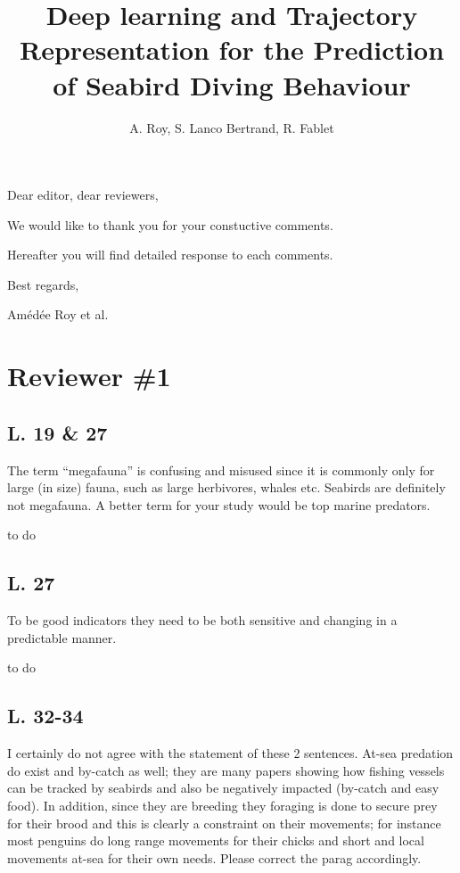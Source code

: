 \documentclass{ar2rc}
\title{Deep learning and Trajectory Representation for the Prediction of Seabird Diving Behaviour}
\author{A. Roy, S. Lanco Bertrand, R. Fablet}
\begin{document}
\maketitle

\section*{}

Dear editor, dear reviewers,

We would like to thank you for your constuctive comments.

Hereafter you will find detailed response to each comments.

Best regards,

Amédée Roy et al.

\section*{Reviewer \#1}

\subsection*{L. 19 \& 27}

\RC The term “megafauna” is confusing and misused since it is commonly only for large (in size) fauna, such as large herbivores, whales etc. Seabirds are definitely not megafauna. A better term for your study would be top marine predators.

\AR to do

\subsection*{L. 27}

\RC To be good indicators they need to be both sensitive and changing in a predictable manner.

\AR to do

\subsection*{L. 32-34}

\RC I certainly do not agree with the statement of these 2 sentences. At-sea predation do exist and by-catch as well; they are many papers showing how fishing vessels can be tracked by seabirds and also be negatively impacted (by-catch and easy food). In addition, since they are breeding they foraging is done to secure prey for their brood and this is clearly a constraint on their movements; for instance most penguins do long range movements for their chicks and short and local movements at-sea for their own needs. Please correct the parag accordingly.
\end{document}
